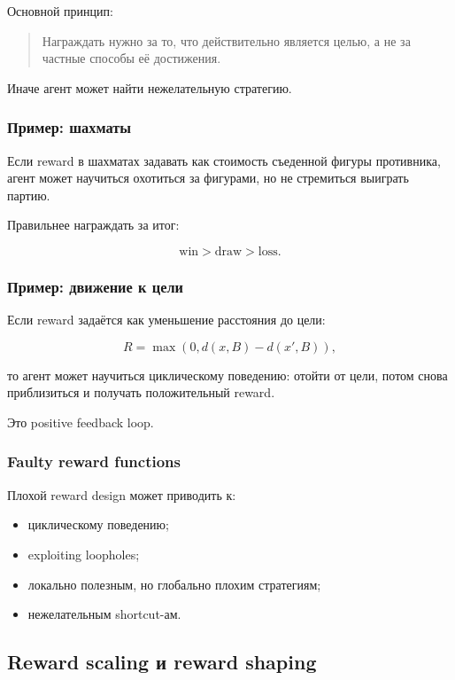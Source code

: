 \documentclass[a4paper,12pt]{article}
\begin{document}
Основной принцип:

\begin{quote}
Награждать нужно за то, что действительно является целью, а не за частные способы её достижения.
\end{quote}

Иначе агент может найти нежелательную стратегию.

\subsubsection{Пример: шахматы}

Если reward в шахматах задавать как стоимость съеденной фигуры противника, агент может научиться охотиться за фигурами, но не стремиться выиграть партию.

Правильнее награждать за итог:

\[
\text{win} > \text{draw} > \text{loss}.
\]

\subsubsection{Пример: движение к цели}

Если reward задаётся как уменьшение расстояния до цели:

\[
R = \max(0, d(x,B)-d(x',B)),
\]

то агент может научиться циклическому поведению: отойти от цели, потом снова приблизиться и получать положительный reward.

Это positive feedback loop.

\subsubsection{Faulty reward functions}

Плохой reward design может приводить к:

\begin{itemize}
    \item циклическому поведению;
    \item exploiting loopholes;
    \item локально полезным, но глобально плохим стратегиям;
    \item нежелательным shortcut-ам.
\end{itemize}

\subsection{Reward scaling и reward shaping}
\end{document}
